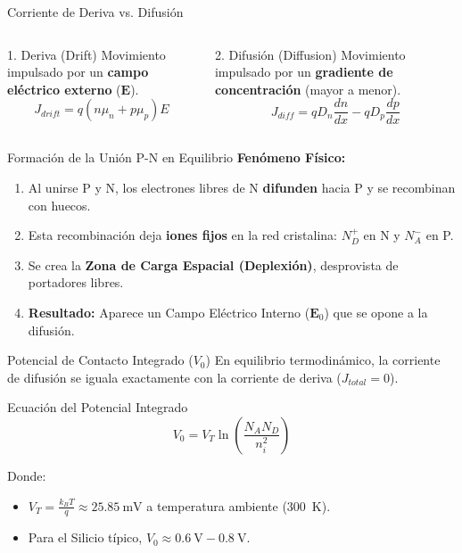 \documentclass[10pt, aspectratio=169]{beamer}
\begin{document}
\begin{frame}{Corriente de Deriva vs. Difusión}
  \begin{columns}
      \begin{block}{1. Deriva (Drift)}
          Movimiento impulsado por un \textbf{campo eléctrico externo} ($\mathbf{E}$).
          \begin{equation*}
          J_{drift} = q (n \mu_n + p \mu_p) E
          \end{equation*}
      \end{block}
      
      \begin{block}{2. Difusión (Diffusion)}
          Movimiento impulsado por un \textbf{gradiente de concentración} (mayor a menor).
          \begin{equation*}
          J_{diff} = q D_n \frac{dn}{dx} - q D_p \frac{dp}{dx}
          \end{equation*}
      \end{block}
  \end{columns}
\end{frame}

\begin{frame}{Formación de la Unión P-N en Equilibrio}
  \textbf{Fenómeno Físico:}
  \begin{enumerate}
      \item Al unirse P y N, los electrones libres de N \textbf{difunden} hacia P y se recombinan con huecos.
      \item Esta recombinación deja \textbf{iones fijos} en la red cristalina: $N_D^+$ en N y $N_A^-$ en P.
      \item Se crea la \textbf{Zona de Carga Espacial (Deplexión)}, desprovista de portadores libres.
      \item \textbf{Resultado:} Aparece un Campo Eléctrico Interno ($\mathbf{E}_0$) que se opone a la difusión.
  \end{enumerate}
\end{frame}

\begin{frame}{Potencial de Contacto Integrado ($V_0$)}
  En equilibrio termodinámico, la corriente de difusión se iguala exactamente con la corriente de deriva ($J_{total} = 0$).
  
  \begin{block}{Ecuación del Potencial Integrado}
  \begin{equation*}
  V_0 = V_T \ln \left( \frac{N_A N_D}{n_i^2} \right)
  \end{equation*}
  \end{block}
  \vspace{0.2cm}
  Donde:
  \begin{itemize}
      \item $V_T = \frac{k_B T}{q} \approx \SI{25.85}{\milli\volt}$ a temperatura ambiente (\SI{300}{\kelvin}).
      \item Para el Silicio típico, $V_0 \approx \SI{0.6}{\volt} - \SI{0.8}{\volt}$.
  \end{itemize}
\end{frame}
\end{document}
